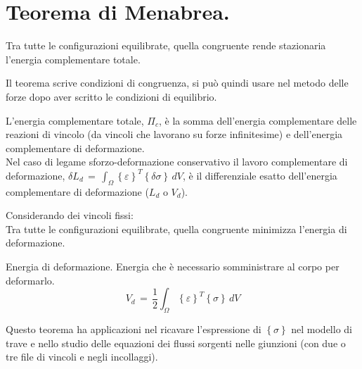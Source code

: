 \section{Teorema di Menabrea.}

\begin{enunciatoBox}
   Tra tutte le configurazioni equilibrate, quella congruente rende stazionaria l'energia complementare totale.
\end{enunciatoBox}
 Il teorema scrive condizioni di congruenza, si può quindi usare nel metodo delle forze dopo aver scritto le condizioni di equilibrio.

 \begin{definizioneBox}
     L'energia complementare totale, $\Pi_c$, è la somma dell'energia complementare delle reazioni di vincolo (da vincoli che lavorano su forze infinitesime) e dell'energia complementare di deformazione.\\
     Nel caso di legame sforzo-deformazione conservativo il lavoro complementare di deformazione, $\delta L_d \, = \, \int_{\Omega} \left\{\varepsilon \right\}^T \left\{\delta\sigma \right\} \, dV$, è il differenziale esatto dell'energia complementare di deformazione ($L_d$ o $V_d$).
 \end{definizioneBox}

 Considerando dei vincoli fissi:\\
 Tra tutte le configurazioni equilibrate, quella congruente minimizza l'energia di deformazione.\\

 \begin{definizioneBox}
     Energia di deformazione. Energia che è necessario somministrare al corpo per deformarlo.
     \begin{equation*}
         V_d \, = \, \frac{1}{2}\int_{\Omega} \left\{\varepsilon \right\}^T \left\{\sigma \right\} \, dV
     \end{equation*}
 \end{definizioneBox}

 Questo teorema ha applicazioni nel ricavare l'espressione di $\left\{\sigma \right\}$ nel modello di trave e nello studio delle equazioni dei flussi sorgenti nelle giunzioni (con due o tre file di vincoli e negli incollaggi).

 
 
 
